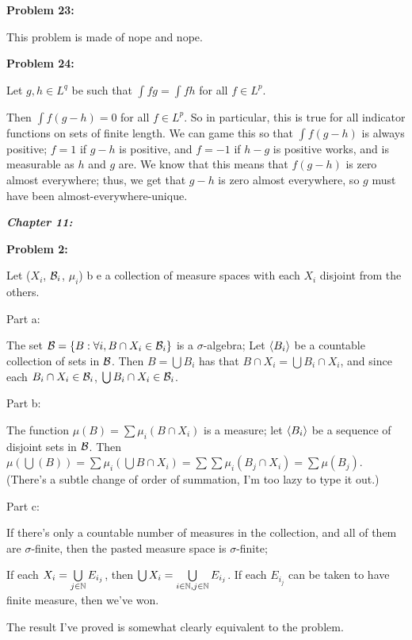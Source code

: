\documentclass[a4paper,12pt]{article}
\begin{document}
\shunt

{\bf Problem 23:}

This problem is made of nope and nope.

\shunt

{\bf Problem 24:}

Let $g,h \in L^q$ be such that $\int fg = \int fh$ for all $f \in L^p$. 

Then $\int f(g-h) = 0$ for all $f \in L^p$. So in particular, this is true for all indicator functions on sets of finite length. We can game this so that $\int f(g-h)$ is always positive; $f = 1$ if $g-h$ is positive, and $f=-1$ if $h-g$ is positive works, and is measurable as $h$ and $g$ are. We know that this means that $f(g-h)$ is zero almost everywhere; thus, we get that $g-h$ is zero almost everywhere, so $g$ must have been almost-everywhere-unique.

\pagebreak

{\Huge{\textit{\textbf{Chapter 11:}}}}

\shunt

{\bf Problem 2:}

Let ($X_i$, $\mathcal{B}_i$, $\mu_i$) b e a collection of measure spaces with each $X_i$ disjoint from the others.

Part a:

The set $\mathcal{B} = \{B: \forall i, B \cap X_i \in \mathcal{B}_i\}$ is a $\sigma$-algebra; Let $\left\langle B_i \right\rangle$ be a countable collection of sets in $\mathcal{B}$. Then $B = \bigcup B_i$ has that $B \cap X_i = \bigcup B_i \cap X_i$, and since each $B_i \cap X_i \in \mathcal{B}_i$, $\bigcup B_i \cap X_i \in \mathcal{B}_i$.

\shunt

Part b:

The function $\mu(B) = \sum \mu_i(B \cap X_i)$ is a measure; let $\left\langle B_i \right\rangle$ be a sequence of disjoint sets in $\mathcal{B}$. Then $\mu(\bigcup(B)) = \sum \mu_i(\bigcup B \cap X_i) = \sum \sum \mu_i(B_j \cap X_i) = \sum \mu(B_j)$. (There's a subtle change of order of summation, I'm too lazy to type it out.)

Part c:

If there's only a countable number of measures in the collection, and all of them are $\sigma$-finite, then the pasted measure space is $\sigma$-finite;

If each $X_i = \bigcup\limits_{j \in \mathbb{N}} E_{i_j}$, then $\bigcup X_i = \bigcup\limits_{i \in \mathbb{N}, j \in \mathbb{N}} E_{i_j}$. If each $E_{i_j}$ can be taken to have finite measure, then we've won.

The result I've proved is somewhat clearly equivalent to the problem.
\end{document}
